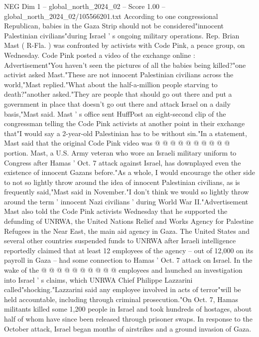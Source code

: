 \begin{textsample}{NEG Dim 1 – global\_north\_2024\_02 – Score 1.00 – global\_north\_2024\_02/105566201.txt}  \label{ex:f1_neg_177}
According to one congressional Republican, babies in the Gaza Strip should not be considered"innocent Palestinian civilians"during Israel ' s ongoing military operations.
Rep.
Brian Mast ( R-Fla. ) was confronted by activists with Code Pink, a peace group, on Wednesday.
Code Pink posted a video of the exchange online : Advertisement"You haven't seen the pictures of all the babies being killed?"one activist asked Mast."These are not innocent Palestinian civilians across the world,"Mast replied."What about the half-a-million people starving to death?"another asked."They are people that should go out there and put a government in place that doesn't go out there and attack Israel on a daily basis,"Mast said.
Mast ' s office sent HuffPost an eight-second clip of the congressman telling the Code Pink activists at another point in their exchange that"I would say a 2-year-old Palestinian has to be without sin."In a statement, Mast said that the original Code Pink video was @ @ @ @ @ @ @ @ @ @ portion.
Mast, a U.S.
Army veteran who wore an Israeli military uniform to Congress after Hamas ' Oct. 7 attack against Israel, has downplayed even the existence of innocent Gazans before."As a whole, I would encourage the other side to not so lightly throw around the idea of innocent Palestinian civilians, as is frequently said,"Mast said in November."I don't think we would so lightly throw around the term ' innocent Nazi civilians ' during World War II."Advertisement Mast also told the Code Pink activists Wednesday that he supported the defunding of UNRWA, the United Nations Relief and Works Agency for Palestine Refugees in the Near East, the main aid agency in Gaza.
The United States and several other countries suspended funds to UNRWA after Israeli intelligence reportedly claimed that at least 12 employees of the agency -- out of 12,000 on its payroll in Gaza -- had some connection to Hamas ' Oct. 7 attack on Israel.
In the wake of the @ @ @ @ @ @ @ @ @ @ employees and launched an investigation into Israel ' s claims, which UNRWA Chief Philippe Lazzarini called"shocking."Lazzarini said any employee involved in acts of terror"will be held accountable, including through criminal prosecution."On Oct. 7, Hamas militants killed some 1,200 people in Israel and took hundreds of hostages, about half of whom have since been released through prisoner swaps.
In response to the October attack, Israel began months of airstrikes and a ground invasion of Gaza.

\end{textsample}
